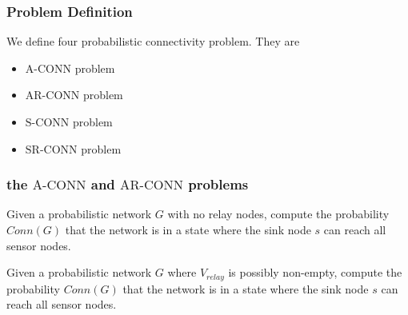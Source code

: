 \documentclass{beamer}
\newcommand{\ACONN}   { {\mathrm {A\mbox{-}CONN}} }
\newcommand{\SCONN}   { {\mathrm {S\mbox{-}CONN}} }
\newcommand{\ARCONN}   { {\mathrm {AR\mbox{-}CONN}} }
\newcommand{\SRCONN}   { {\mathrm {SR\mbox{-}CONN}} }
\begin{document}
\begin{frame}
\frametitle{Problem Definition}
We define four probabilistic connectivity problem. They are 
\begin{itemize}
\item $\ACONN$ problem
\item $\ARCONN$ problem
\item $\SCONN$ problem
\item $\SRCONN$ problem
\end{itemize}
\end{frame}
\begin{frame}
\frametitle{the $\ACONN$ and $\ARCONN$ problems}
\begin{definition}
\normalfont
Given a probabilistic network $G$ with no relay nodes, compute the probability $Conn(G)$ that the network is in a state where the sink node $s$ can reach all sensor nodes. 
\end{definition}

\begin{definition}
\normalfont
Given a probabilistic network $G$ where $V_{relay}$ is possibly non-empty, compute the probability $Conn(G)$ that the network is in a state where the sink node $s$ can reach all sensor nodes. 
\end{definition}

\end{frame}
\end{document}
